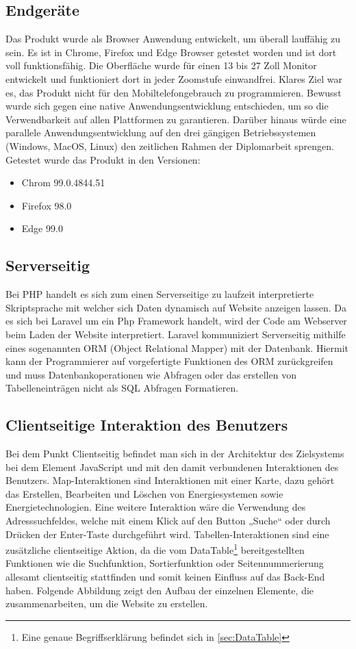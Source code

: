 \subsection{Endgeräte}
Das Produkt wurde als Browser Anwendung entwickelt, um überall lauffähig zu sein. Es ist in Chrome, Firefox und Edge Browser getestet worden und ist dort voll funktionsfähig. Die Oberfläche wurde für einen 13 bis 27 Zoll Monitor entwickelt und funktioniert dort in jeder Zoomstufe einwandfrei. Klares Ziel war es, das Produkt nicht für den Mobiltelefongebrauch zu programmieren. Bewusst wurde sich gegen eine native Anwendungsentwicklung entschieden, um so die Verwendbarkeit auf allen Plattformen zu garantieren. Darüber hinaus würde eine parallele Anwendungsentwicklung auf den drei gängigen Betriebssystemen (Windows, MacOS, Linux) den zeitlichen Rahmen der Diplomarbeit sprengen. Getestet wurde das Produkt in den Versionen:

\begin{itemize}
	\item Chrom 99.0.4844.51
	\item Firefox 98.0
	\item Edge 99.0
\end{itemize}

\subsection{Serverseitig}
Bei PHP handelt es sich zum einen Serverseitige zu laufzeit interpretierte Skriptsprache mit welcher sich Daten dynamisch auf Website anzeigen lassen. Da es sich bei Laravel um ein Php Framework handelt, wird der Code am Webserver beim Laden der Website interpretiert. Laravel kommuniziert Serverseitig mithilfe eines sogenannten ORM (Object Relational Mapper) mit der Datenbank. Hiermit kann der Programmierer auf vorgefertigte Funktionen des ORM zurückgreifen und muss Datenbankoperationen wie Abfragen oder das erstellen von Tabelleneinträgen nicht als SQL Abfragen Formatieren.

\subsection{Clientseitige Interaktion des Benutzers}
Bei dem Punkt Clientseitig befindet man sich in der Architektur des Zielsystems bei dem Element JavaScript und mit den damit verbundenen Interaktionen des Benutzers. Map-Interaktionen sind Interaktionen mit einer Karte, dazu gehört das Erstellen, Bearbeiten und Löschen von Energiesystemen sowie Energietechnologien. Eine weitere Interaktion wäre die Verwendung des Adresssuchfeldes, welche mit einem Klick auf den Button „Suche“ oder durch Drücken der Enter-Taste durchgeführt wird. Tabellen-Interaktionen sind eine zusätzliche clientseitige Aktion, da die vom DataTable\footnote{Eine genaue Begriffserklärung befindet sich in \ref{sec:DataTable}} bereitgestellten Funktionen wie die Suchfunktion, Sortierfunktion oder Seitennummerierung allesamt clientseitig stattfinden und somit keinen Einfluss auf das Back-End haben.
Folgende Abbildung zeigt den Aufbau der einzelnen Elemente, die zusammenarbeiten, um die Website zu erstellen.


